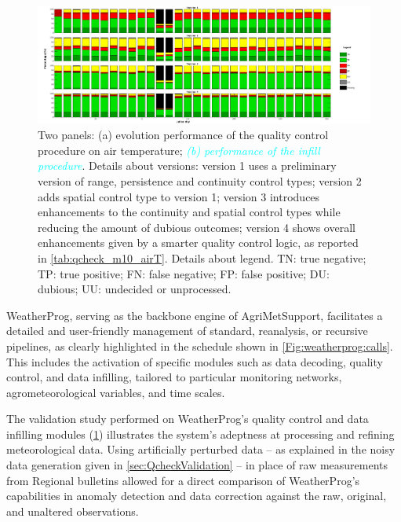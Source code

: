 \documentclass[authoryear,preprint,review,12pt]{elsarticle}
\newcommand{\review}[1]{\emph{\textcolor{cyan}{#1}}}
\begin{document}
\begin{figure}
	\centering
	\includegraphics[scale=.30]{figures/Fig_qck_versions.tif}
	\caption{ Two panels: 
    (a) evolution performance of the quality control procedure on air temperature;
    \review{(b) performance of the infill procedure}.
    Details about versions: version 1 uses a preliminary version of range, persistence and continuity control types; version 2 adds spatial control type to version 1; version 3 introduces enhancements to the continuity and spatial control types while reducing the amount of dubious outcomes; version 4 shows overall enhancements given by a smarter quality control logic, as reported in \cref{tab:qcheck_m10_airT}.
    Details about legend. TN: true negative; TP: true positive; FN: false negative; FP: false positive; DU: dubious; UU: undecided or unprocessed. }
	\label{fig:perturbationCharts}
\end{figure}

WeatherProg, serving as the backbone engine of AgriMetSupport, facilitates a detailed and user-friendly management of standard, reanalysis, or recursive pipelines, as clearly highlighted in the schedule shown in \cref{Fig:weatherprog:calls}.
This includes the activation of specific modules such as data decoding, quality control, and data infilling, tailored to particular monitoring networks, agrometeorological variables, and time scales.

The validation study performed on WeatherProg's quality control and data infilling modules (\cref{fig:perturbationCharts}) illustrates the system's adeptness at processing and refining meteorological data.
Using artificially perturbed data -- as explained in the noisy data generation given in \cref{sec:QcheckValidation} -- in place of raw measurements from Regional bulletins allowed for a direct comparison of WeatherProg's capabilities in anomaly detection and data correction against the raw, original, and unaltered observations.
\end{document}
